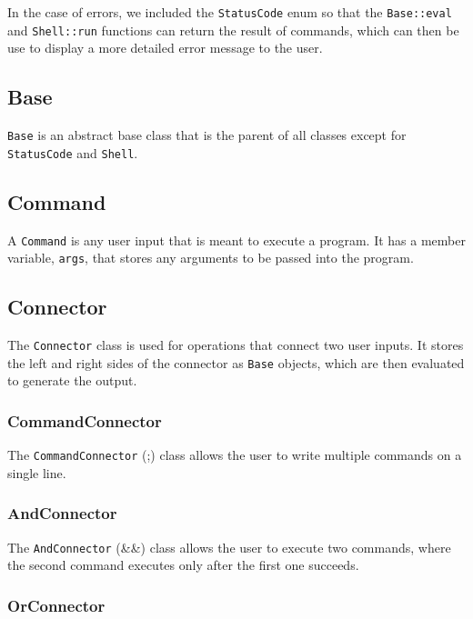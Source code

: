 \documentclass{article}
\begin{document}
In the case of errors, we included the \texttt{StatusCode} enum so that the \texttt{Base::eval} and \texttt{Shell::run} functions can return the result of commands, which can then be use to display a more detailed error message to the user.

\subsection{Base}

\texttt{Base} is an abstract base class that is the parent of all classes except for \texttt{StatusCode} and \texttt{Shell}.

\subsection{Command}

A \texttt{Command} is any user input that is meant to execute a program. It has a member variable, \texttt{args}, that stores any arguments to be passed into the program.

\subsection{Connector}

The \texttt{Connector} class is used for operations that connect two user inputs. It stores the left and right sides of the connector as \texttt{Base} objects, which are then evaluated to generate the output.

\subsubsection{CommandConnector}

The \texttt{CommandConnector} (;) class allows the user to write multiple commands on a single line.

\subsubsection{AndConnector}

The \texttt{AndConnector} (\&\&) class allows the user to execute two commands, where the second command executes only after the first one succeeds.

\subsubsection{OrConnector}
\end{document}
